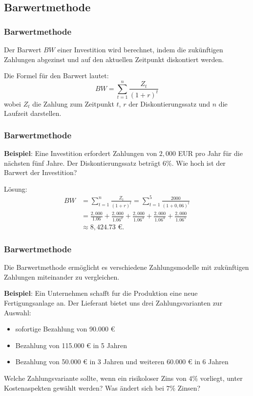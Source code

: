 \documentclass{beamer}
\begin{document}
\subsection{Barwertmethode}
\begin{frame}
  \frametitle{Barwertmethode}
  Der Barwert $BW$ einer Investition wird berechnet, indem die zukünftigen Zahlungen abgezinst und auf den aktuellen Zeitpunkt diskontiert werden.
  
  \vspace{0.3cm}
  
  Die Formel für den Barwert lautet: $$BW = \sum_{t=1}^{n} \frac{Z_t}{(1+r)^t}$$ 
  wobei $Z_t$ die Zahlung zum Zeitpunkt $t$, $r$ der Diskontierungssatz und $n$ die Laufzeit darstellen.
  

\end{frame}


\begin{frame}
  \frametitle{Barwertmethode}
  
  \textbf{Beispiel}: Eine Investition erfordert Zahlungen von $2,000$ EUR pro Jahr für die nächsten fünf Jahre. Der Diskontierungssatz beträgt $6\%$. Wie hoch ist der Barwert der Investition?
  
  \vspace{0.3cm}
  
  Lösung:
  \begin{align*}
    BW &= \sum_{t=1}^{n} \frac{Z_t}{(1+r)^t} = \sum_{t=1}^{5} \frac{2000}{(1+0,06)^t}\\
    &= \frac{2,000}{1.06} + \frac{2,000}{1.06^2} + \frac{2,000}{1.06^3} + \frac{2,000}{1.06^4} + \frac{2,000}{1.06^5}\\  
    &\approx 8,424.73 \text{ €.}  
  \end{align*}
\end{frame}

\begin{frame}
    \frametitle{Barwertmethode}
    Die Barwertmethode ermöglicht es verschiedene Zahlungsmodelle mit zukünftigen Zahlungen miteinander zu vergleichen.

    \textbf{Beispiel}: Ein Unternehmen schafft fur die Produktion eine neue Fertigungsanlage an. Der
    Lieferant bietet uns drei Zahlungsvarianten zur Auswahl:
    \begin{itemize}
        \item sofortige Bezahlung von 90.000 €
        \item Bezahlung von 115.000 € in 5 Jahren
        \item Bezahlung von 50.000 € in 3 Jahren und weiteren 60.000 € in 6 Jahren
    \end{itemize}
    Welche Zahlungsvariante sollte, wenn ein risikoloser Zins von $4\%$ vorliegt, unter Kostenaspekten gewählt werden? Was ändert sich bei $7\%$ Zinsen?
\end{frame}
\end{document}
